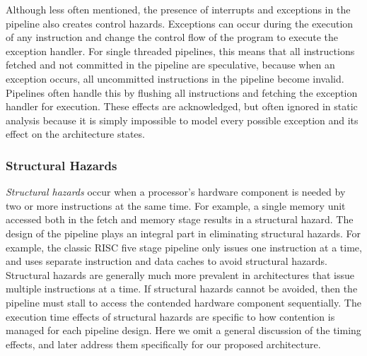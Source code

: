 Although less often mentioned, the presence of interrupts and exceptions in the pipeline also creates control hazards. 
Exceptions can occur during the execution of any instruction and change the control flow of the program to execute the exception handler.
For single threaded pipelines, this means that all instructions fetched and not committed in the pipeline are speculative, because when an exception occurs, all uncommitted instructions in the pipeline become invalid.
Pipelines often handle this by flushing all instructions and fetching the exception handler for execution.      
These effects are acknowledged, but often ignored in static analysis because it is simply impossible to model every possible exception and its effect on the architecture states. 
 
\subsubsection{Structural Hazards}
\emph{Structural hazards} occur when a processor's hardware component is needed by two or more instructions at the same time. 
For example, a single memory unit accessed both in the fetch and memory stage results in a structural hazard. 
The design of the pipeline plays an integral part in eliminating structural hazards. 
For example, the classic RISC five stage pipeline only issues one instruction at a time, and uses separate instruction and data caches to avoid structural hazards.
Structural hazards are generally much more prevalent in architectures that issue multiple instructions at a time.
If structural hazards cannot be avoided, then the pipeline must stall to access the contended hardware component sequentially.
The execution time effects of structural hazards are specific to how contention is managed for each pipeline design.
Here we omit a general discussion of the timing effects, and later address them specifically for our proposed architecture. 

